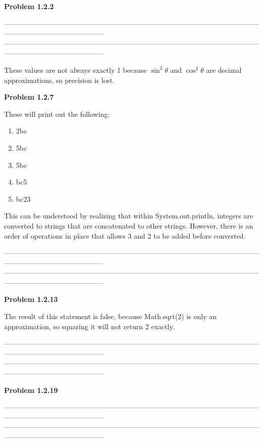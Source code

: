 \documentclass{article}
\newcommand{\Problem}[1]{\textbf{Problem #1}}
\begin{document}
\Problem{1.2.2}

------------------------------------------------------------------------------------------------------------------------------------------------------
------------------------------------------------------------------------------------------------------------------------------------------------------

These values are not always exactly 1 because $\sin^2{\theta}$ and $\cos^2{\theta}$ are decimal approximations, so precision is lost. 

\Problem{1.2.7}

These will print out the following:
\begin{enumerate}
\item 2bc
\item 5bc
\item 5bc
\item bc5
\item bc23	
\end{enumerate}

This can be understood by realizing that within System.out.println, integers are converted to strings that are concatenated to other strings. However, there is an order of operations in place that allows 3 and 2 to be added before converted.  

------------------------------------------------------------------------------------------------------------------------------------------------------
------------------------------------------------------------------------------------------------------------------------------------------------------

\Problem{1.2.13}

The result of this statement is false, because Math.sqrt(2) is only an approximation, so squaring it will not return 2 exactly. 

------------------------------------------------------------------------------------------------------------------------------------------------------
------------------------------------------------------------------------------------------------------------------------------------------------------

\Problem{1.2.19}

------------------------------------------------------------------------------------------------------------------------------------------------------
------------------------------------------------------------------------------------------------------------------------------------------------------
\end{document}

